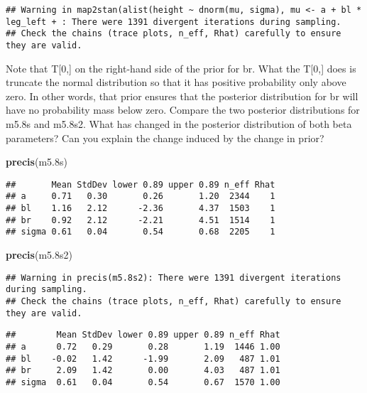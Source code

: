 \documentclass[]{article}
\newenvironment{Shaded}{\begin{snugshade}}{\end{snugshade}}
\newcommand{\KeywordTok}[1]{\textcolor[rgb]{0.13,0.29,0.53}{\textbf{#1}}}
\newcommand{\NormalTok}[1]{#1}
\begin{document}
\begin{verbatim}
## Warning in map2stan(alist(height ~ dnorm(mu, sigma), mu <- a + bl * leg_left + : There were 1391 divergent iterations during sampling.
## Check the chains (trace plots, n_eff, Rhat) carefully to ensure they are valid.
\end{verbatim}

Note that T{[}0,{]} on the right-hand side of the prior for br. What the
T{[}0,{]} does is truncate the normal distribution so that it has
positive probability only above zero. In other words, that prior ensures
that the posterior distribution for br will have no probability mass
below zero. Compare the two posterior distributions for m5.8s and
m5.8s2. What has changed in the posterior distribution of both beta
parameters? Can you explain the change induced by the change in prior?

\begin{Shaded}
\begin{Highlighting}[]
\KeywordTok{precis}\NormalTok{(m5.8s)}
\end{Highlighting}
\end{Shaded}

\begin{verbatim}
##       Mean StdDev lower 0.89 upper 0.89 n_eff Rhat
## a     0.71   0.30       0.26       1.20  2344    1
## bl    1.16   2.12      -2.36       4.37  1503    1
## br    0.92   2.12      -2.21       4.51  1514    1
## sigma 0.61   0.04       0.54       0.68  2205    1
\end{verbatim}

\begin{Shaded}
\begin{Highlighting}[]
\KeywordTok{precis}\NormalTok{(m5.8s2)}
\end{Highlighting}
\end{Shaded}

\begin{verbatim}
## Warning in precis(m5.8s2): There were 1391 divergent iterations during sampling.
## Check the chains (trace plots, n_eff, Rhat) carefully to ensure they are valid.
\end{verbatim}

\begin{verbatim}
##        Mean StdDev lower 0.89 upper 0.89 n_eff Rhat
## a      0.72   0.29       0.28       1.19  1446 1.00
## bl    -0.02   1.42      -1.99       2.09   487 1.01
## br     2.09   1.42       0.00       4.03   487 1.01
## sigma  0.61   0.04       0.54       0.67  1570 1.00
\end{verbatim}
\end{document}
